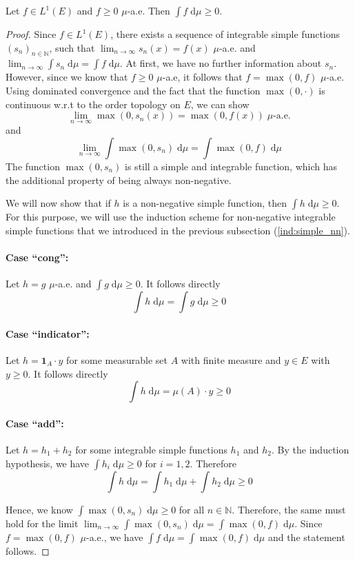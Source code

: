 \begin{lemma}
	Let $f \in L^1(E)$ and $f \ge 0$ $\mu$-a.e. Then $\int f \;\textrm{d}\mu \ge 0$.
\end{lemma}
\begin{proof}
	Since $f \in L^1(E)$, there exists a sequence of integrable simple functions $(s_n)_{n \in \mathbb{N}}$, such that $\lim_{n \to \infty} s_n(x) = f(x)$ $\mu$-a.e. and $\lim_{n \to \infty} \int s_n \;\textrm{d}\mu = \int f \;\textrm{d}\mu$. At first, we have no further information about $s_n$. However, since we know that $f \ge 0$ $\mu$-a.e, it follows that $f = \max(0,f)$ $\mu$-a.e. Using dominated convergence and the fact that the function $\max(0,\cdot)$ is continuous w.r.t to the order topology on $E$, we can show
\[
	\lim_{n \to \infty} \max(0, s_n(x)) = \max(0, f(x)) \; \mu\textrm{-a.e.}
\]
and
\[
	\lim_{n \to \infty} \int \max(0, s_n) \;\textrm{d}\mu = \int \max(0, f) \;\textrm{d}\mu
\]
The function $\max(0, s_n)$ is still a simple and integrable function, which has the additional property of being always non-negative. 

We will now show that if $h$ is a non-negative simple function, then $\int h \;\textrm{d}\mu \ge 0$. For this purpose, we will use the induction scheme for non-negative integrable simple functions that we introduced in the previous subsection (\ref{ind:simple_nn}).

\paragraph{Case ``cong'':} Let $h = g$ $\mu$-a.e. and $\int g \;\textrm{d}\mu \ge 0$. It follows directly
\[
	\int h \;\textrm{d}\mu = \int g \;\textrm{d}\mu \ge 0
\]

\paragraph{Case ``indicator'':} Let $h = \mathbf{1}_A \cdot y$ for some measurable set $A$ with finite measure and $y \in E$ with $y \ge 0$. It follows directly 
\[
	\int h \;\textrm{d}\mu = \mu(A) \cdot y \ge 0
\]

\paragraph{Case ``add'':} Let $h = h_1 + h_2$ for some integrable simple functions $h_1$ and $h_2$. By the induction hypothesis, we have $\int h_i \;\textrm{d}\mu \ge 0$ for $i = 1,2$. Therefore
\[
	\int h \;\textrm{d}\mu = \int h_1 \;\textrm{d}\mu + \int h_2 \;\textrm{d}\mu \ge 0
\]

Hence, we know $\int \max(0, s_n) \;\textrm{d}\mu \ge 0$ for all $n \in \mathbb{N}$. Therefore, the same must hold for the limit $\lim_{n \to \infty} \int \max(0, s_n) \;\textrm{d}\mu = \int \max(0, f) \;\textrm{d}\mu$. Since $f = \max(0,f)$ $\mu$-a.e., we have $\int f \;\textrm{d}\mu = \int \max(0, f) \;\textrm{d}\mu$ and the statement follows.

\end{proof}
